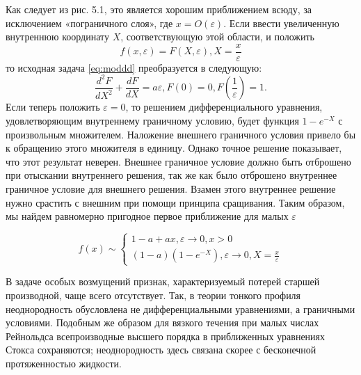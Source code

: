 \documentclass[12pt,a4paper,titlepage]{article}
\theoremstyle{definition}
\theoremstyle{remark}
\begin{document}
  Как следует из рис. 5.1, это является хорошим приближением всюду,
  за исключением «пограничного слоя», где $x = O(\varepsilon)$.
  Если ввести увеличенную внутреннюю координату $X$, 
  соответствующую этой области, и положить
  $$
    f(x, \varepsilon) = F(X, \varepsilon), X = \frac{x}{\varepsilon}
  $$
  то исходная задача \ref{eq:moddd} преобразуется в следующую:
  $$
    \frac{d^2F}{dX^2} + \frac{dF}{dX} = a\varepsilon, F(0) = 0, F(\frac{1}{\varepsilon}) = 1.
  $$
  Если теперь положить $\varepsilon = 0$, то решением дифференциального уравнения,
  удовлетворяющим внутреннему граничному условию, будет функция $ 1 - e^{-X}$
  с произвольным множителем.
  Наложение внешнего граничного условия привело бы к обращению этого множителя в единицу.
  Однако точное решение показывает, что этот результат неверен.
  Внешнее граничное условие должно быть отброшено при отыскании внутреннего решения,
  так же как было отброшено внутреннее граничное условие для внешнего решения.
  Взамен этого внутреннее решение нужно срастить с внешним при помощи принципа сращивания.
  Таким образом, мы найдем равномерно пригодное первое приближение для малых $\varepsilon$

  $$
  {
    \displaystyle f(x)\sim{
      \begin{cases}
        1 - a + ax, \varepsilon \rightarrow 0, x > 0 \\
        (1 - a)(1 - e^{-X}), \varepsilon \rightarrow 0, X=\frac{x}{\varepsilon} 
      \end{cases}
      }
    }
  $$

  В задаче особых возмущений признак,
  характеризуемый потерей старшей производной,
  чаще всего отсутствует.
  Так, в теории тонкого профиля неоднородность обусловлена не дифференциальными уравнениями,
  а граничными условиями.
  Подобным же образом для вязкого течения при малых числах Рейнольдса
  всепроизводные высшего порядка в приближенных уравнениях Стокса сохраняются;
  неоднородность здесь связана скорее с бесконечной протяженностью жидкости.
\end{document}

